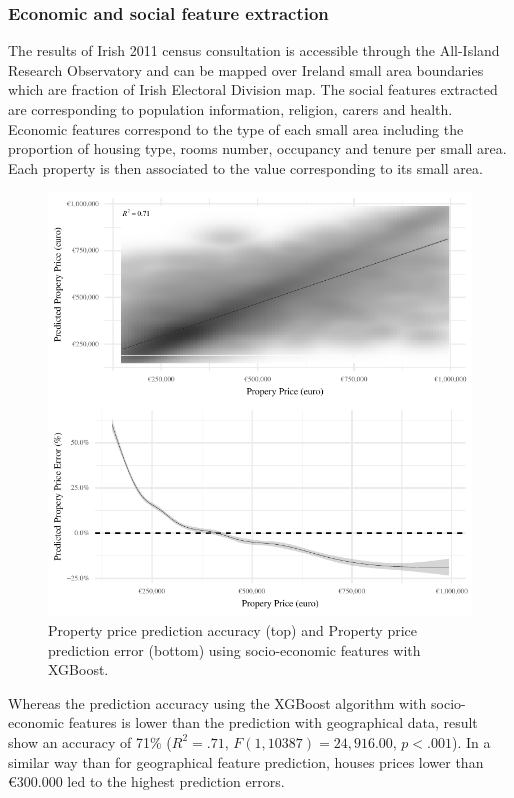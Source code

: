 \documentclass[]{elsarticle} %
\begin{document}
\hypertarget{economic-and-social-feature-extraction}{%
\subsubsection{Economic and social feature
extraction}\label{economic-and-social-feature-extraction}}

The results of Irish 2011 census consultation is accessible through the
All-Island Research Observatory and can be mapped over Ireland small
area boundaries which are fraction of Irish Electoral Division map. The
social features extracted are corresponding to population information,
religion, carers and health. Economic features correspond to the type of
each small area including the proportion of housing type, rooms number,
occupancy and tenure per small area. Each property is then associated to
the value corresponding to its small area.

\begin{figure}[H]
\includegraphics{property_price_paper_new_files/figure-latex/census-features-xgb-1} \caption{Property price prediction accuracy (top) and Property price prediction error (bottom) using socio-economic features with XGBoost.}\label{fig:census-features-xgb}
\end{figure}

Whereas the prediction accuracy using the XGBoost algorithm with
socio-economic features is lower than the prediction with geographical
data, result show an accuracy of 71\% (\(R^2 = .71\),
\(F(1, 10387) = 24,916.00\), \(p < .001\)). In a similar way than for
geographical feature prediction, houses prices lower than €300.000 led
to the highest prediction errors.
\end{document}
